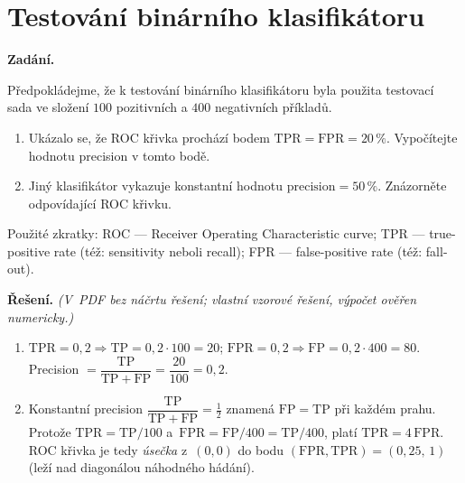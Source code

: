 \section{Testování binárního klasifikátoru}

\noindent\textbf{Zadání.}\par
Předpokládejme, že k testování binárního klasifikátoru byla použita testovací sada ve složení
$100$ pozitivních a $400$ negativních příkladů.

\begin{enumerate}
  \item[a)] Ukázalo se, že ROC křivka prochází bodem $\mathrm{TPR} = \mathrm{FPR} = 20\,\%$.
    Vypočítejte hodnotu precision v tomto bodě.
  \item[b)] Jiný klasifikátor vykazuje konstantní hodnotu $\text{precision} = 50\,\%$.
    Znázorněte odpovídající ROC křivku.
\end{enumerate}

\noindent Použité zkratky: ROC — Receiver Operating Characteristic curve; TPR — true-positive rate
(též: sensitivity neboli recall); FPR — false-positive rate (též: fall-out).

\medskip
\noindent\textbf{Řešení.} \textit{(V~PDF bez náčrtu řešení; vlastní vzorové řešení, výpočet ověřen numericky.)}\par
\begin{enumerate}
  \item[a)] $\mathrm{TPR}=0{,}2\Rightarrow \mathrm{TP}=0{,}2\cdot100=20$; $\mathrm{FPR}=0{,}2\Rightarrow \mathrm{FP}=0{,}2\cdot400=80$. Precision $=\dfrac{\mathrm{TP}}{\mathrm{TP}+\mathrm{FP}}=\dfrac{20}{100}=0{,}2$.
  \item[b)] Konstantní precision $\dfrac{\mathrm{TP}}{\mathrm{TP}+\mathrm{FP}}=\tfrac12$ znamená $\mathrm{FP}=\mathrm{TP}$ při každém prahu. Protože $\mathrm{TPR}=\mathrm{TP}/100$ a~$\mathrm{FPR}=\mathrm{FP}/400=\mathrm{TP}/400$, platí $\mathrm{TPR}=4\,\mathrm{FPR}$. ROC křivka je tedy \emph{úsečka} z~$(0,0)$ do bodu $(\mathrm{FPR},\mathrm{TPR})=(0{,}25,\,1)$ (leží nad diagonálou náhodného hádání).
\end{enumerate}
